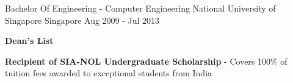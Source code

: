 \begin{cventries}
  \cventry
    {Bachelor Of Engineering - Computer Engineering}
    {National University of Singapore}
    {Singapore}
    {Aug 2009 - Jul 2013}
    {
      \begin{cvitems} %
        \item {\textbf{Dean's List} }
        \vspace{0.5mm}
        \item {\textbf{Recipient of SIA-NOL Undergraduate Scholarship} - Covers 100\% of tuition fees awarded to exceptional students from India }
      \end{cvitems}      
    }
\end{cventries}
